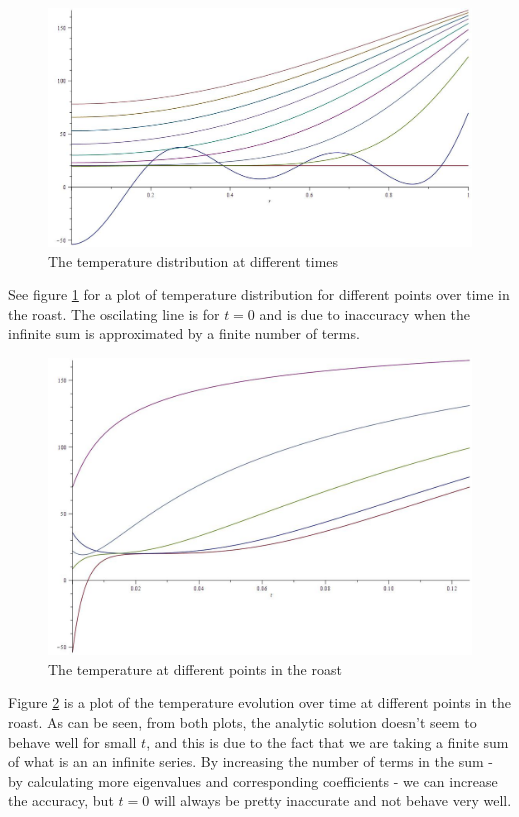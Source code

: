 \documentclass{report}
\begin{document}
\begin{figure}[h]
\centering
\includegraphics[scale = 0.15]{temperature-distribution-in-radius-analytic}
\caption{The temperature distribution at different times}
\label{fig:td}
\end{figure}

See figure \ref{fig:td} for a plot of temperature distribution for different points over time in the roast. 
The oscilating line is for $t = 0$ and is due to inaccuracy when the infinite sum is approximated by a finite 
number of terms.\bigskip 

\begin{figure}[h]
\centering
\includegraphics[scale = 0.15]{temperature-evolution-in-time-analytic}
\caption{The temperature at different points in the roast}
\label{fig:te}
\end{figure}

Figure \ref{fig:te} is a plot of the temperature evolution over time at different points in the roast. As can 
be seen, from both plots, the analytic solution doesn't seem to behave well for small $t$, and this is due to 
the fact that we are taking a finite sum of what is an an infinite series. By increasing the number of terms 
in the sum - by calculating more eigenvalues and corresponding coefficients - we can increase the accuracy, 
but $t = 0$ will always be pretty inaccurate and not behave very well.\bigskip 
\end{document}
